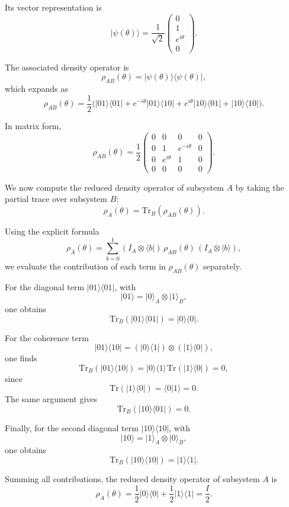\documentclass[a4paper]{article}
\begin{document}
Its vector representation is
\[
|\psi(\theta)\rangle =
\frac{1}{\sqrt{2}}
\begin{pmatrix}
0 \\
1 \\
e^{i\theta} \\
0
\end{pmatrix}.
\]

The associated density operator is
\[
\rho_{AB}(\theta) = |\psi(\theta)\rangle\langle\psi(\theta)|,
\]
which expands as
\[
\rho_{AB}(\theta)
=
\frac{1}{2}
\Big(
|01\rangle\langle 01|
+
e^{-i\theta}|01\rangle\langle 10|
+
e^{i\theta}|10\rangle\langle 01|
+
|10\rangle\langle 10|
\Big).
\]

In matrix form,
\[
\rho_{AB}(\theta)
=
\frac{1}{2}
\begin{pmatrix}
0 & 0 & 0 & 0 \\
0 & 1 & e^{-i\theta} & 0 \\
0 & e^{i\theta} & 1 & 0 \\
0 & 0 & 0 & 0
\end{pmatrix}.
\]

We now compute the reduced density operator of subsystem $A$ by taking the partial trace over subsystem $B$:
\[
\rho_A(\theta) = \mathrm{Tr}_B(\rho_{AB}(\theta)).
\]

Using the explicit formula
\[
\rho_A(\theta)
=
\sum_{b=0}^{1}
(I_A \otimes \langle b|)\,\rho_{AB}(\theta)\,(I_A \otimes |b\rangle),
\]
we evaluate the contribution of each term in $\rho_{AB}(\theta)$ separately.

For the diagonal term $|01\rangle\langle 01|$, with
\[
|01\rangle = |0\rangle_A \otimes |1\rangle_B,
\]
one obtains
\[
\mathrm{Tr}_B(|01\rangle\langle 01|) = |0\rangle\langle 0|.
\]

For the coherence term
\[
|01\rangle\langle 10|
=
(|0\rangle\langle 1|)\otimes(|1\rangle\langle 0|),
\]
one finds
\[
\mathrm{Tr}_B(|01\rangle\langle 10|)
=
|0\rangle\langle 1|\,\mathrm{Tr}(|1\rangle\langle 0|)
=
0,
\]
since
\[
\mathrm{Tr}(|1\rangle\langle 0|)=\langle 0|1\rangle = 0.
\]
The same argument gives
\[
\mathrm{Tr}_B(|10\rangle\langle 01|) = 0.
\]

Finally, for the second diagonal term $|10\rangle\langle 10|$, with
\[
|10\rangle = |1\rangle_A \otimes |0\rangle_B,
\]
one obtains
\[
\mathrm{Tr}_B(|10\rangle\langle 10|) = |1\rangle\langle 1|.
\]

Summing all contributions, the reduced density operator of subsystem $A$ is
\[
\rho_A(\theta)
=
\frac{1}{2}|0\rangle\langle 0|
+
\frac{1}{2}|1\rangle\langle 1|
=
\frac{I}{2}.
\]
\end{document}
